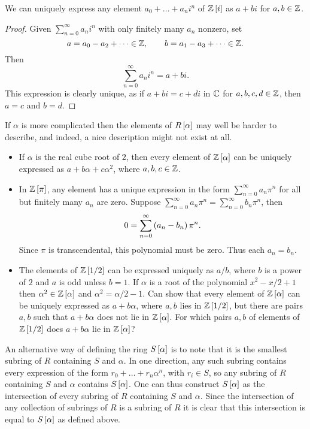 \begin{proposition}
We can uniquely express any element $ a_0 + \dots + a_ni^n $ of $ \Z\sb{i} $ as $ a + bi $ for $ a, b \in \Z $.
\end{proposition}

\begin{proof}
Given $ \sum_{n = 0}^\infty a_ni^n $ with only finitely many $ a_n $ nonzero, set
$$ a = a_0 - a_2 + \dots \in \Z, \qquad b = a_1 - a_3 + \dots \in \Z. $$
Then
$$ \sum_{n = 0}^\infty a_ni^n = a + bi. $$
This expression is clearly unique, as if $ a + bi = c + di $ in $ \C $ for $ a, b, c, d \in \Z $, then $ a = c $ and $ b = d $.
\end{proof}

If $ \alpha $ is more complicated then the elements of $ R\sb{\alpha} $ may well be harder to describe, and indeed, a nice description might not exist at all.

\begin{example*}
\hfill
\begin{itemize}
\item If $ \alpha $ is the real cube root of $ 2 $, then every element of $ \Z\sb{\alpha} $ can be uniquely expressed as $ a + b\alpha + c\alpha^2 $, where $ a, b, c \in \Z $.
\item In $ \Z\sb{\pi} $, any element has a unique expression in the form $ \sum_{n = 0}^\infty a_n\pi^n $ for all but finitely many $ a_n $ are zero. Suppose $ \sum_{n = 0}^\infty a_n\pi^n = \sum_{n = 0}^\infty b_n\pi^n $, then
$$ 0 = \sum_{n = 0}^\infty \rb{a_n - b_n}\pi^n. $$
Since $ \pi $ is transcendental, this polynomial must be zero. Thus each $ a_n = b_n $.
\item The elements of $ \Z\sb{1 / 2} $ can be expressed uniquely as $ a / b $, where $ b $ is a power of $ 2 $ and $ a $ is odd unless $ b = 1 $. If $ \alpha $ is a root of the polynomial $ x^2 - x / 2 + 1 $ then $ \alpha^2 \in \Z\sb{\alpha} $ and $ \alpha^2 = \alpha / 2 - 1 $. Can show that every element of $ \Z\sb{\alpha} $ can be uniquely expressed as $ a + b\alpha $, where $ a, b $ lies in $ \Z\sb{1 / 2} $, but there are pairs $ a, b $ such that $ a + b\alpha $ does not lie in $ \Z\sb{\alpha} $. For which pairs $ a, b $ of elements of $ \Z\sb{1 / 2} $ does $ a + b\alpha $ lie in $ \Z\sb{\alpha} $?
\end{itemize}
\end{example*}

An alternative way of defining the ring $ S\sb{\alpha} $ is to note that it is the smallest subring of $ R $ containing $ S $ and $ \alpha $. In one direction, any such subring contains every expression of the form $ r_0 + \dots + r_n\alpha^n $, with $ r_i \in S $, so any subring of $ R $ containing $ S $ and $ \alpha $ contains $ S\sb{\alpha} $. One can thus construct $ S\sb{\alpha} $ as the intersection of every subring of $ R $ containing $ S $ and $ \alpha $. Since the intersection of any collection of subrings of $ R $ is a subring of $ R $ it is clear that this intersection is equal to $ S\sb{\alpha} $ as defined above.

